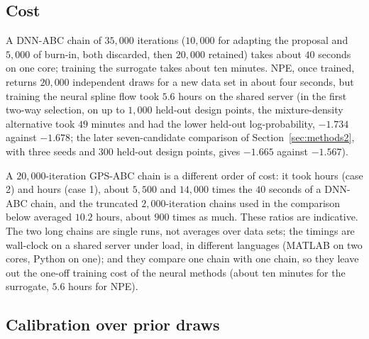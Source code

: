 \documentclass[sn-basic,iicol,pdflatex]{sn-jnl}
\begin{document}
\subsection{Cost}
\label{sec:cost}

A DNN-ABC chain of $35{,}000$ iterations ($10{,}000$ for adapting the proposal \citep{haario2001} and $5{,}000$ of burn-in, both discarded, then
$20{,}000$ retained) takes about $40$ seconds on one core; training the surrogate
takes about ten minutes. NPE, once trained, returns $20{,}000$ independent draws for a new data set in about four
seconds, but training the neural spline flow took $5.6$ hours on the shared server
(in the first two-way selection, on up to $1{,}000$ held-out design points, the mixture-density alternative took $49$ minutes and had the lower held-out log-probability, $-1.734$ against $-1.678$; the later seven-candidate comparison of Section~\ref{sec:methods2}, with three seeds and $300$ held-out design points, gives $-1.665$ against $-1.567$).

A $20{,}000$-iteration GPS-ABC chain is a different order of cost: it took \gtrCaseTwoHours{} hours (case 2) and \gtrCaseOneHours{} hours (case 1), about $5{,}500$ and $14{,}000$ times the $40$ seconds of a DNN-ABC chain, and the truncated $2{,}000$-iteration chains used in the comparison below averaged $10.2$ hours, about $900$ times as much. These ratios are indicative. The two long chains are single runs, not averages over data sets; the timings are wall-clock on a shared server under load, in different languages (MATLAB on two cores, Python on one); and they compare one chain with one chain, so they leave out the one-off training cost of the neural methods (about ten minutes for the surrogate, $5.6$ hours for NPE).

\subsection{Calibration over prior draws}
\label{sec:sim3D_sbc}
\end{document}
